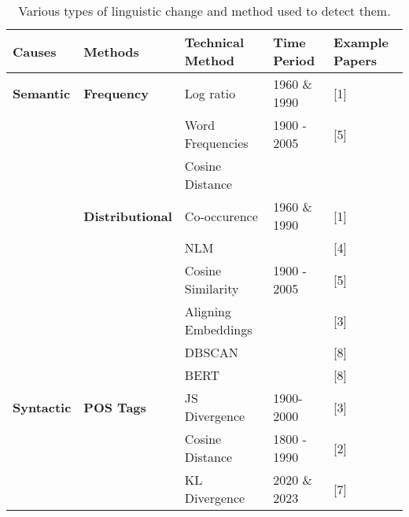 \begin{table}[t]
\centering
\begin{tabular}{lllll}
\toprule
\textbf{Causes}    & \textbf{Methods}        & \textbf{Technical Method} & \textbf{Time Period} & \textbf{Example Papers} \\ \hline
\textbf{Semantic}  & \textbf{Frequency}      & Log ratio                 & 1960 \& 1990         & {[}1{]}                 \\ \hline
                   &                         & Word Frequencies          & 1900 - 2005          & {[}5{]}                 \\ \cline{3-5}
                   &                         & Cosine Distance           &                      &                         \\ \cline{2-5}
                   & \textbf{Distributional} & Co-occurence              & 1960 \& 1990         & {[}1{]}                 \\ \cline{2-5}
                   &                         & NLM                       &                      & {[}4{]}                 \\ \cline{3-5}
                   &                         & Cosine Similarity         & 1900 - 2005          & {[}5{]}                 \\ \cline{3-5}
                   &                         & Aligning Embeddings       &                      & {[}3{]}                 \\ \cline{3-5}
                   &                         & DBSCAN                    &                      & {[}8{]}                 \\ \cline{3-5}
                   &                         & BERT                      &                      & {[}8{]}                 \\ \hline
\textbf{Syntactic} & \textbf{POS Tags}       & JS Divergence             & 1900-2000            & {[}3{]}                 \\ \hline
                   &                         & Cosine Distance           & 1800 - 1990          & {[}2{]}                 \\ \cline{3-5}
\textbf{}          & \textbf{}               & KL Divergence             & 2020 \& 2023         & {[}7{]}                 \\
\bottomrule
\end{tabular}
\caption{Various types of linguistic change and method used to detect them.}
\label{tab:related-work}
\end{table}